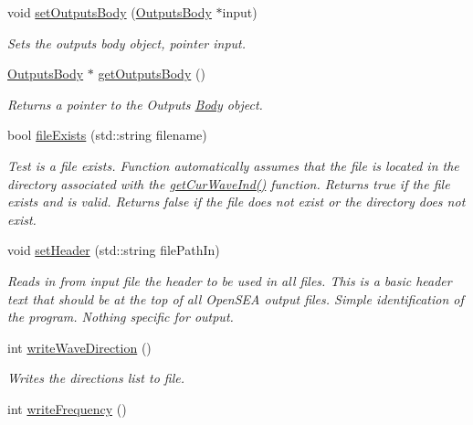 \begin{DoxyCompactItemize}
void \hyperlink{classosea_1_1ofreq_1_1_file_writer_af0234f3573308ca6f5b7178f662b3993}{set\-Outputs\-Body} (\hyperlink{classosea_1_1ofreq_1_1_outputs_body}{Outputs\-Body} $\ast$input)
\begin{DoxyCompactList}\small\item\em Sets the outputs body object, pointer input. \end{DoxyCompactList}\item 
\hyperlink{classosea_1_1ofreq_1_1_outputs_body}{Outputs\-Body} $\ast$ \hyperlink{classosea_1_1ofreq_1_1_file_writer_a2794a9410be184745cd98f26df801ab2}{get\-Outputs\-Body} ()
\begin{DoxyCompactList}\small\item\em Returns a pointer to the Outputs \hyperlink{classosea_1_1ofreq_1_1_body}{Body} object. \end{DoxyCompactList}\item 
bool \hyperlink{classosea_1_1ofreq_1_1_file_writer_afc22f7afcd30f676e5385133247ed84d}{file\-Exists} (std\-::string filename)
\begin{DoxyCompactList}\small\item\em Test is a file exists. Function automatically assumes that the file is located in the directory associated with the \hyperlink{classosea_1_1ofreq_1_1_file_writer_a9748d987475a225b49e14f48b8be0cd6}{get\-Cur\-Wave\-Ind()} function. Returns true if the file exists and is valid. Returns false if the file does not exist or the directory does not exist. \end{DoxyCompactList}\item 
void \hyperlink{classosea_1_1ofreq_1_1_file_writer_a310daaf404e9a0ef1f609eaea85e1bb0}{set\-Header} (std\-::string file\-Path\-In)
\begin{DoxyCompactList}\small\item\em Reads in from input file the header to be used in all files. This is a basic header text that should be at the top of all Open\-S\-E\-A output files. Simple identification of the program. Nothing specific for output. \end{DoxyCompactList}\item 
int \hyperlink{classosea_1_1ofreq_1_1_file_writer_af8b7b6236b90e1734161f6158f64482b}{write\-Wave\-Direction} ()
\begin{DoxyCompactList}\small\item\em Writes the directions list to file. \end{DoxyCompactList}\item 
int \hyperlink{classosea_1_1ofreq_1_1_file_writer_a99e8d1ffb93b50966735bb90d0f4e082}{write\-Frequency} ()

\end{DoxyCompactItemize}
